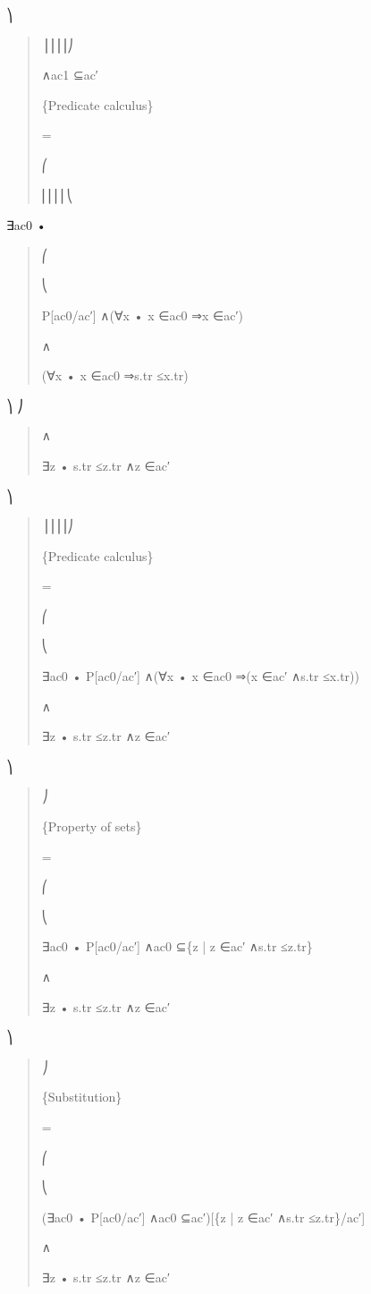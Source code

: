 \documentclass[11pt]{article}
\begin{document}
⎞

\begin{quote}\small\raggedright
⎟⎟⎟⎟⎠
\par
∧ac1 ⊆ac′
\par
\{Predicate calculus\}
\par
=
\par
⎛
\par
⎜⎜⎜⎜⎝
\end{quote}

∃ac0 •

\begin{quote}\small\raggedright
⎛
\par
⎝
\par
P[ac0/ac′] ∧(∀x • x ∈ac0 ⇒x ∈ac′)
\par
∧
\par
(∀x • x ∈ac0 ⇒s.tr ≤x.tr)
\end{quote}

⎞ ⎠

\begin{quote}\small\raggedright
∧
\par
∃z • s.tr ≤z.tr ∧z ∈ac′
\end{quote}

⎞

\begin{quote}\small\raggedright
⎟⎟⎟⎟⎠
\par
\{Predicate calculus\}
\par
=
\par
⎛
\par
⎝
\par
∃ac0 • P[ac0/ac′] ∧(∀x • x ∈ac0 ⇒(x ∈ac′ ∧s.tr ≤x.tr))
\par
∧
\par
∃z • s.tr ≤z.tr ∧z ∈ac′
\end{quote}

⎞

\begin{quote}\small\raggedright
⎠
\par
\{Property of sets\}
\par
=
\par
⎛
\par
⎝
\par
∃ac0 • P[ac0/ac′] ∧ac0 ⊆\{z | z ∈ac′ ∧s.tr ≤z.tr\}
\par
∧
\par
∃z • s.tr ≤z.tr ∧z ∈ac′
\end{quote}

⎞

\begin{quote}\small\raggedright
⎠
\par
\{Substitution\}
\par
=
\par
⎛
\par
⎝
\par
(∃ac0 • P[ac0/ac′] ∧ac0 ⊆ac′)[\{z | z ∈ac′ ∧s.tr ≤z.tr\}/ac′]
\par
∧
\par
∃z • s.tr ≤z.tr ∧z ∈ac′
\end{quote}
\end{document}
